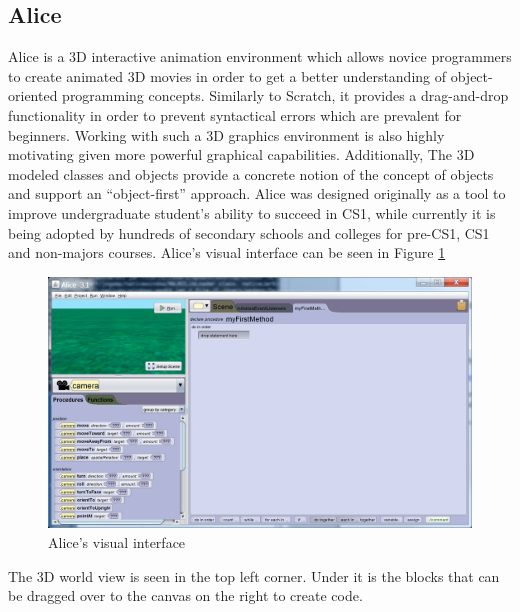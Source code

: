 \subsection{Alice}
Alice is a 3D interactive animation environment which allows novice programmers to create animated 3D movies in order to get a better understanding of object-oriented programming concepts. Similarly to Scratch, it provides a drag-and-drop functionality in order to prevent syntactical errors which are prevalent for beginners. Working with such a 3D graphics environment is also highly motivating given more powerful graphical capabilities.
Additionally,  The 3D modeled classes and objects
provide a concrete notion of the concept of objects
and support an “object-first” approach. Alice was designed originally as a tool to improve undergraduate student's ability to succeed in CS1, while currently it is being adopted by hundreds of secondary schools and colleges for pre-CS1, CS1 and non-majors courses\cite{Alicecourse}. Alice's visual interface can be seen in Figure \ref{fig:alice_environment}
\begin{figure}[H]
\begin{center}
\includegraphics[scale=0.14]{./pics/Alice3D.png}
\caption{Alice's visual interface\protect\footnotemark}
\label{fig:alice_environment}
\end{center}
\end{figure}


The 3D world view is seen in the top left corner. Under it is the blocks that can be dragged over to the canvas on the right to create code.

